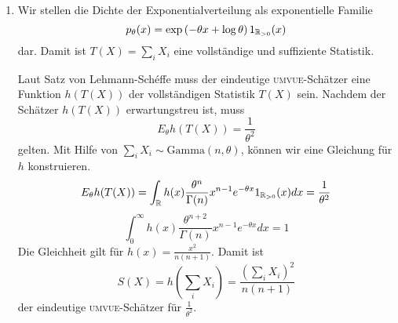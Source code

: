 \solution 
\begin{enumerate}
    \item
Wir stellen die Dichte der Exponentialverteilung als exponentielle Familie 
\begin{equation*}
    p_\theta(x) = \exp \left( -\theta x + \log \theta \right) 1_{\mathbb R_{>0}}(x)
\end{equation*}
dar. Damit ist $T(X)=\sum_{i}^{} X_i$ eine vollständige und suffiziente Statistik.

Laut Satz von Lehmann-Sch\'effe muss der eindeutige \textsc{umvue}-Schätzer
eine Funktion $h(T(X))$ der vollständigen Statistik $T(X)$ sein. Nachdem der
Schätzer $h(T(X))$ erwartungstreu ist, muss
\begin{equation*}
    E_\theta h(T(X)) = \frac{1}{\theta^2}
\end{equation*}
gelten. Mit Hilfe von $\sum_{i}^{} X_i \sim \textrm{Gamma}(n,\theta)$, können
wir eine Gleichung für $h$ konstruieren.
\begin{equation*}
    E_\theta h(T(X)) =  \int_{\mathbb R} h(x) \frac{\theta^n}{\Gamma(n)} x^{n-1}e^{-\theta x} 1_{\mathbb R_{>0}}(x) dx =\frac{1}{\theta^2} 
\end{equation*}
\begin{equation*}
    \int_{0}^{\infty} h(x) \frac{\theta^{n+2}}{\Gamma(n)}  x^{n-1} e^{-\theta x} dx = 1
\end{equation*}
Die Gleichheit gilt für $h(x)= \frac{x^2}{n(n+1)}$. Damit ist 
\begin{equation*}
    S(X) = h\left( \sum_{i}^{} X_i \right) = \frac{\left( \sum_{i}^{} X_i \right)^2}{n(n+1)}
\end{equation*}
der eindeutige \textsc{umvue}-Schätzer für $\frac{1}{\theta^2}$.


\end{enumerate}
